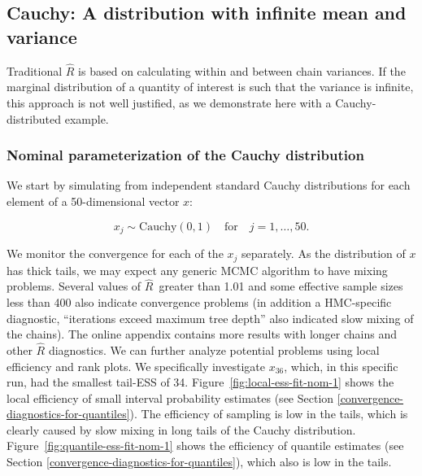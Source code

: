 \documentclass[american,]{article}
\newcommand{\Rhat}{$\widehat{R}$}
\theoremstyle{definition}
\begin{document}
\hypertarget{cauchy-a-distribution-with-infinite-mean-and-variance}{%
\subsection{Cauchy: A distribution with infinite mean and
variance}\label{cauchy-a-distribution-with-infinite-mean-and-variance}}

Traditional \(\widehat{R}\) is based on calculating
within and between chain variances. If the marginal distribution of a quantity of interest
is such that the variance is infinite,
this approach is not well justified, as we demonstrate here with a Cauchy-distributed example.

\hypertarget{nominal-parameterization-of-the-cauchy-distribution}{%
\subsubsection*{Nominal parameterization of the
Cauchy distribution}\label{nominal-parameterization-of-the-cauchy-distribution}}

We start by simulating  from  independent standard Cauchy distributions for each 
element of a 50-dimensional vector $x$:

\begin{equation}
x_j \sim \text{Cauchy}(0, 1)  \quad \text{for} \quad j=1,\dots,50.
\end{equation}

We monitor the convergence for each of the $x_j$ separately. As the distribution of $x$
has thick tails, we may expect any generic MCMC algorithm to have mixing problems.
Several values of \Rhat\ greater than 1.01 and some effective sample sizes less 
than 400 also indicate convergence problems (in addition a HMC-specific diagnostic,
``iterations exceed maximum tree depth'' \citep{StanManual.2.18.0} also
indicated slow mixing of the chains).
The online appendix contains more results 
with longer chains and other \(\widehat{R}\) diagnostics.
%
We can further analyze potential problems using local efficiency and
rank plots. We specifically investigate \(x_{36}\), which, in this
specific run, had the smallest tail-ESS of 34. 
Figure~\ref{fig:local-ess-fit-nom-1} shows the local efficiency of small 
interval probability estimates (see Section \ref{convergence-diagnostics-for-quantiles}).
The efficiency of sampling is low in the tails, which is clearly
caused by slow mixing in long tails of the Cauchy distribution.  
%
Figure~\ref{fig:quantile-ess-fit-nom-1} shows the efficiency
of quantile estimates (see Section \ref{convergence-diagnostics-for-quantiles}), 
which also is low in the tails. 
\end{document}

